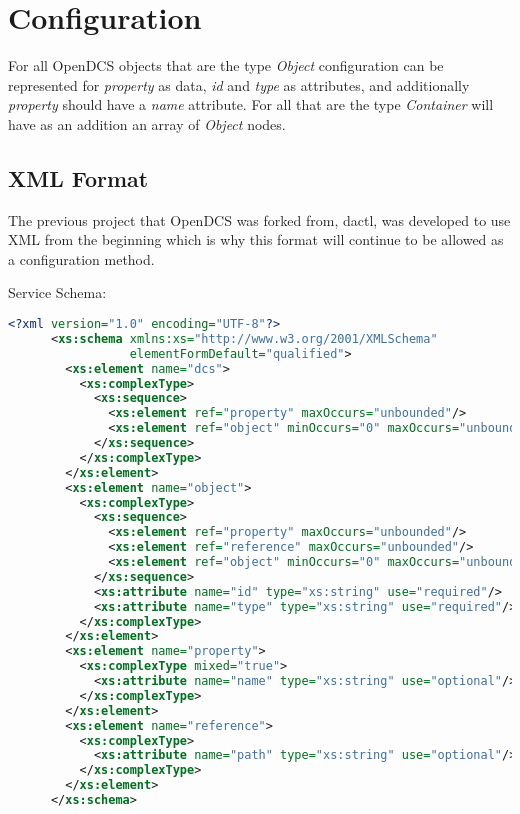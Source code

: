 \section{Configuration}\label{sec:cfg}

  For all OpenDCS objects that are the type \emph{Object} configuration can be
  represented for \emph{property} as data, \emph{id} and \emph{type} as
  attributes, and additionally \emph{property} should have a \emph{name}
  attribute. For all that are the type \emph{Container} will have as an
  addition an array of \emph{Object} nodes.

  \subsection{XML Format}\label{sec:cfg-xml}

    The previous project that OpenDCS was forked from, dactl, was developed to
    use XML from the beginning which is why this format will continue to be
    allowed as a configuration method.

    Service Schema:

    \begin{lstlisting}[language=XML,caption={OpenDCS Service Schema},label={lst:cfg-xml-schema}]
      <?xml version="1.0" encoding="UTF-8"?>
      <xs:schema xmlns:xs="http://www.w3.org/2001/XMLSchema"
                 elementFormDefault="qualified">
        <xs:element name="dcs">
          <xs:complexType>
            <xs:sequence>
              <xs:element ref="property" maxOccurs="unbounded"/>
              <xs:element ref="object" minOccurs="0" maxOccurs="unbounded"/>
            </xs:sequence>
          </xs:complexType>
        </xs:element>
        <xs:element name="object">
          <xs:complexType>
            <xs:sequence>
              <xs:element ref="property" maxOccurs="unbounded"/>
              <xs:element ref="reference" maxOccurs="unbounded"/>
              <xs:element ref="object" minOccurs="0" maxOccurs="unbounded"/>
            </xs:sequence>
            <xs:attribute name="id" type="xs:string" use="required"/>
            <xs:attribute name="type" type="xs:string" use="required"/>
          </xs:complexType>
        </xs:element>
        <xs:element name="property">
          <xs:complexType mixed="true">
            <xs:attribute name="name" type="xs:string" use="optional"/>
          </xs:complexType>
        </xs:element>
        <xs:element name="reference">
          <xs:complexType>
            <xs:attribute name="path" type="xs:string" use="optional"/>
          </xs:complexType>
        </xs:element>
      </xs:schema>
    \end{lstlisting}

